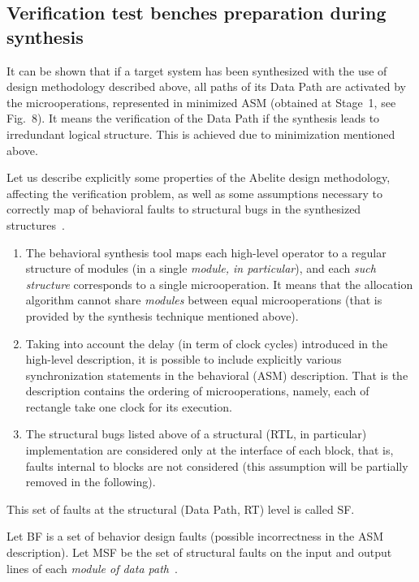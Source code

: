 \begin{multicols}{2}
\subsection{Verification test benches preparation during synthesis  } %

   \noindent
It can be shown that if a target system has been synthe\-sized with the use of design methodology described
above, all paths of its Data Path are activated by the microoperations, represented in minimized ASM (obtained
at Stage~1, see Fig.~8).  It means the verification of the Data Path if the synthesis leads to irredundant
logical structure. This is achieved due to minimization mentioned above.

   Let us describe explicitly some properties of the Abelite design methodology, affecting the verification
problem, as well as some assumptions necessary to correctly map of behavioral faults to structural bugs in the
synthesized structures~\cite{7bar}.
\begin{enumerate}[1.]
\item The behavioral synthesis tool maps each high-level operator
to a regular structure of modules (in a single
\textit{module, in particular}), and each \textit{such structure}
corresponds to a single microoperation.  It means that the allocation
algorithm cannot share \textit{modules} between equal microoperations
(that is provided by the synthesis technique mentioned above).
\item Taking into account the delay (in term of clock cycles) introduced in the high-level description, it is
possible to include explicitly various synchronization statements in the behavioral (ASM) description. That is
the description contains the ordering of microoperations, namely, each of rectangle take one clock for its
execution.
\item The structural bugs listed above of a structural (RTL, in particular) implementation are considered only at
the interface of each block, that is, faults internal to blocks are not considered (this assumption will be partially
removed in the following).
   \end{enumerate}

   This set of faults at the structural (Data Path, RT) level is called SF.

   Let BF is a set of behavior design faults (possible incorrectness in the ASM description). Let MSF be the set
of structural faults on the input and output lines of each \textit{module of data path}~\cite{7bar}.


\end{multicols}
